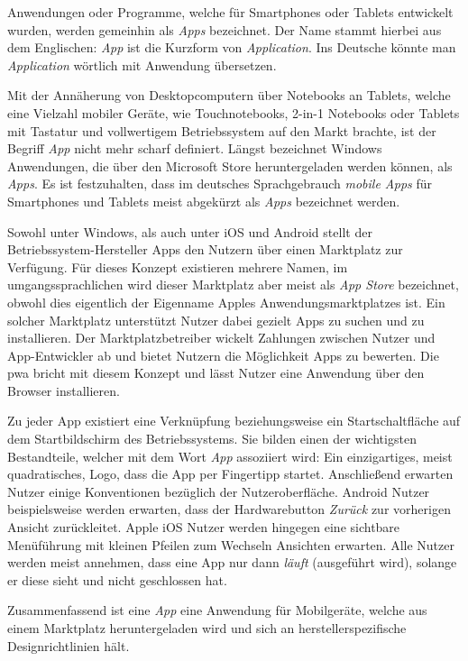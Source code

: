 Anwendungen oder Programme, welche für Smartphones oder Tablets entwickelt wurden, werden gemeinhin als \textit{Apps} bezeichnet. Der Name stammt hierbei aus dem Englischen: \textit{App} ist die Kurzform von \textit{Application}. Ins Deutsche könnte man \textit{Application} wörtlich mit Anwendung übersetzen. \cite{BegriffApp}

Mit der Annäherung von Desktopcomputern über Notebooks an Tablets, welche eine Vielzahl mobiler Geräte, wie Touchnotebooks, 2-in-1 Notebooks oder Tablets mit Tastatur und vollwertigem Betriebssystem auf den Markt brachte, ist der Begriff \textit{App} nicht mehr scharf definiert.
Längst bezeichnet Windows Anwendungen, die über den Microsoft Store heruntergeladen werden können, als \textit{Apps}. Es ist festzuhalten, dass im deutsches Sprachgebrauch \textit{mobile Apps} für Smartphones und Tablets meist abgekürzt als \textit{Apps} bezeichnet werden.

Sowohl unter Windows, als auch unter iOS und Android stellt der Betriebssystem-Hersteller Apps den Nutzern über einen Marktplatz zur Verfügung. Für dieses Konzept existieren mehrere Namen, im umgangssprachlichen wird dieser Marktplatz aber meist als \textit{App Store} bezeichnet, obwohl dies eigentlich der Eigenname Apples Anwendungsmarktplatzes ist. 
Ein solcher Marktplatz unterstützt Nutzer dabei gezielt Apps zu suchen und zu installieren. Der Marktplatzbetreiber wickelt Zahlungen zwischen Nutzer und App-Entwickler ab und bietet Nutzern die Möglichkeit Apps zu bewerten. 
Die \acf{pwa} bricht mit diesem Konzept und lässt Nutzer eine Anwendung über den Browser installieren. 

Zu jeder App existiert eine Verknüpfung beziehungsweise ein Startschaltfläche auf dem Startbildschirm des Betriebssystems. Sie bilden einen der wichtigsten Bestandteile, welcher mit dem Wort \textit{App} assoziiert wird: Ein einzigartiges, meist quadratisches, Logo, dass die App per Fingertipp startet. Anschließend erwarten Nutzer einige Konventionen bezüglich der Nutzeroberfläche. Android Nutzer beispielsweise werden erwarten, dass der Hardwarebutton \textit{Zurück} zur vorherigen Ansicht zurückleitet. Apple iOS Nutzer werden hingegen eine sichtbare Menüführung mit kleinen Pfeilen zum Wechseln Ansichten erwarten. Alle Nutzer werden meist annehmen, dass eine App nur dann \textit{läuft} (ausgeführt wird), solange er diese sieht und nicht geschlossen hat.

Zusammenfassend ist eine \textit{App} eine Anwendung für Mobilgeräte, welche aus einem Marktplatz heruntergeladen wird und sich an herstellerspezifische Designrichtlinien hält.